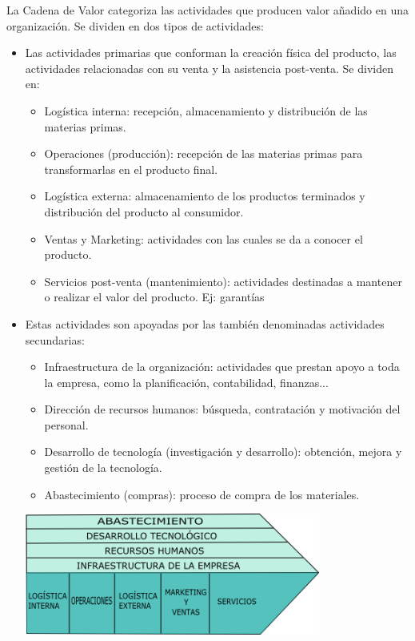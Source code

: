 La Cadena de Valor categoriza las actividades que producen valor añadido en una organización. Se dividen en dos tipos de actividades:
\begin{itemize}
	\item Las actividades primarias que conforman la creación física del producto, las actividades relacionadas con su venta y la asistencia post-venta. Se dividen en:
	\begin{itemize}
		\item Logística interna: recepción, almacenamiento y distribución de las materias primas.
		\item Operaciones (producción): recepción de las materias primas para transformarlas en el producto final.
		\item Logística externa: almacenamiento de los productos terminados y distribución del producto al consumidor.
		\item Ventas y Marketing: actividades con las cuales se da a conocer el producto.
		\item Servicios post-venta (mantenimiento): actividades destinadas a mantener o realizar el valor del producto. Ej: garantías
	\end{itemize}
	\item Estas actividades son apoyadas por las también denominadas actividades secundarias:
	\begin{itemize}
		\item Infraestructura de la organización: actividades que prestan apoyo a toda la empresa, como la planificación, contabilidad, finanzas...
		\item Dirección de recursos humanos: búsqueda, contratación y motivación del personal.
		\item Desarrollo de tecnología (investigación y desarrollo): obtención, mejora y gestión de la tecnología.
		\item Abastecimiento (compras): proceso de compra de los materiales.
	\end{itemize}
\begin{center}
	\includegraphics[height=4cm]{images/cadenaDeValor}
\end{center}

\end{itemize}

